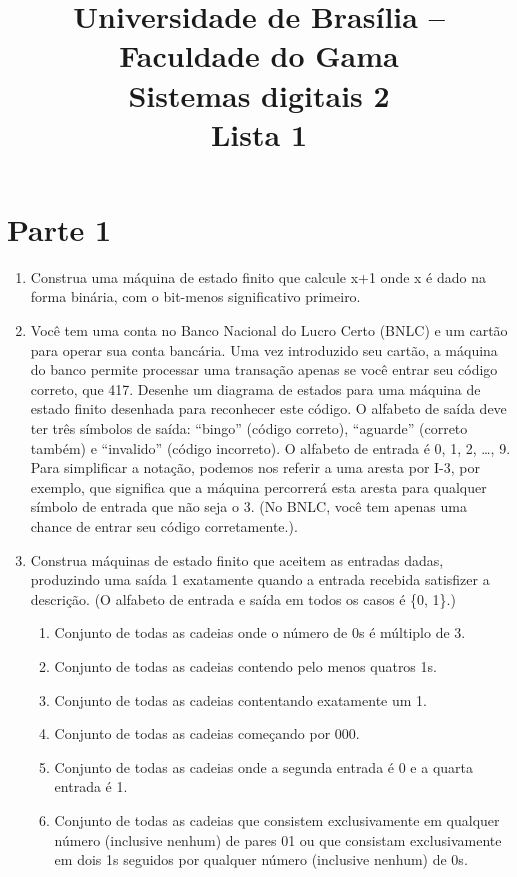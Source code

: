 \documentclass[a4paper,10pt]{article}
\title{ \textbf{Universidade de Brasília -- Faculdade do Gama \\ Sistemas digitais 2 \\ Lista 1 }}
\begin{document}
\maketitle

\section{Parte 1}
\begin{enumerate}
 \item Construa uma máquina de estado finito que calcule x+1 onde x é dado na forma binária, com o bit-menos significativo primeiro.
 \item Você tem uma conta no Banco Nacional do Lucro Certo (BNLC) e um cartão para operar sua conta bancária. Uma vez introduzido seu cartão, a máquina do banco 
       permite processar uma transação apenas se você entrar seu código correto, que 417. Desenhe um diagrama de estados para uma máquina de estado finito desenhada 
       para reconhecer este código. O alfabeto de saída deve ter três símbolos de saída: “bingo” (código correto), “aguarde” (correto também) e “invalido” (código 
       incorreto). O alfabeto de entrada é {0, 1, 2, …, 9}. Para simplificar a notação, podemos nos referir a uma aresta por I-{3}, por exemplo, que significa que a 
       máquina percorrerá esta aresta para qualquer símbolo de entrada que não seja o 3. (No BNLC, você tem apenas uma chance de entrar seu código corretamente.).
 \item Construa máquinas de estado finito que aceitem as entradas dadas, produzindo uma saída 1 exatamente quando a entrada recebida satisfizer a descrição. (O alfabeto 
       de entrada e saída em todos os casos é \{0, 1\}.)
       \begin{enumerate}
	\item Conjunto de todas as cadeias onde o número de 0s é múltiplo de 3.
	\item Conjunto de todas as cadeias contendo pelo menos quatros 1s.
	\item Conjunto de todas as cadeias contentando exatamente um 1.
	\item Conjunto de todas as cadeias começando por 000.
	\item Conjunto de todas as cadeias onde a segunda entrada é 0 e a quarta entrada é 1.
	\item Conjunto de todas as cadeias que consistem exclusivamente em qualquer número (inclusive nenhum) de pares 01 ou que consistam exclusivamente em dois 1s seguidos por qualquer número (inclusive nenhum) de 0s.

\end{enumerate}
\end{enumerate}
\end{document}
